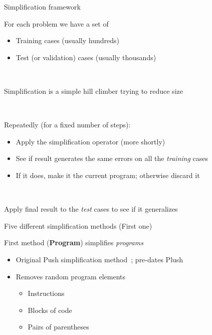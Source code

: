 \documentclass{beamer}
\begin{document}
\begin{frame}{Simplification framework}

For each problem we have a set of
\begin{itemize}
	\item Training cases (usually hundreds)
	\item Test (or validation) cases (usually thousands)
\end{itemize}

~

Simplification is a simple hill climber trying to reduce size

~

Repeatedly (for a fixed number of steps):
\begin{itemize}
	\item Apply the simplification operator (more shortly)
	\item See if result generates the same errors on all the \emph{training} cases
	\item If it does, make it the current program; otherwise discard it
\end{itemize}


~

Apply final result to the \emph{test} cases to see if it generalizes

\end{frame}

\begin{frame}{Five different simplification methods (First one)}

First method (\textbf{Program}) simplifies \emph{programs}
\begin{itemize}
	\item Original Push simplification method~\cite{Spector:2014:GECCOcomp}; pre-dates Plush
	\item Removes random program elements
	\begin{itemize}
		\item Instructions
		\item Blocks of code
		\item Pairs of parentheses
	\end{itemize}
\end{itemize}


\end{frame}
\end{document}
